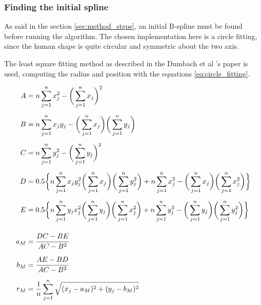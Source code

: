 \documentclass{article}
\newcommand{\vsp}{\vspace{\baselineskip}}
\begin{document}
\subsubsection{Finding the initial spline}

As said in the section \ref{sec:method_steps}, an initial B-spline must be found before running the algorithm. The chosen implementation here is a circle fitting, since the human shape is quite circular and symmetric about the two axis.

\vsp

The least square fitting method as described in the Dumbach et al 's paper \cite{circle_fitting} is used, computing the radius and position with the equations \ref{eq:circle_fitting}.

\begin{equation}
    \label{eq:circle_fitting}
    \begin{aligned}
        A &= n \sum \limits_{j=1}^{n}x_j^2 - 
        \bigg( \sum \limits_{j=1}^{n} x_j \bigg) ^2
        \\[5pt]
        B &= n \sum \limits_{j=1}^{n}x_j y_j -
        \bigg( \sum \limits_{j=1}^{n} x_j \bigg)
        \bigg( \sum \limits_{j=1}^{n} y_j \bigg) 
        \\[5pt]
        C &= n \sum \limits_{j=1}^{n}y_j^2 - 
        \bigg( \sum \limits_{j=1}^{n} y_j \bigg) ^2
        \\[5pt]
        D &= 0.5 \bigg\{ 
        n \sum \limits_{j=1}^{n}x_j y_j^2 
        \bigg( \sum \limits_{j=1}^{n} x_j \bigg) \bigg( \sum \limits_{j=1}^{n} y_j^2 \bigg)
        + n \sum \limits_{j=1}^{n}x_j^3 - 
        \bigg( \sum \limits_{j=1}^{n} x_j \bigg)
        \bigg( \sum \limits_{j=1}^{n} x_j^2 \bigg)
        \bigg\} 
        \\[5pt]
        E &=  0.5 \bigg\{
        n \sum \limits_{j=1}^{n}y_j x_j^2 
        \bigg( \sum \limits_{j=1}^{n} y_j \bigg) \bigg( \sum \limits_{j=1}^{n} x_j^2 \bigg)
        + n \sum \limits_{j=1}^{n}y_j^3 - 
        \bigg( \sum \limits_{j=1}^{n} y_j \bigg)
        \bigg( \sum \limits_{j=1}^{n} y_j^2 \bigg)
        \bigg\}
        \\[10pt]
        a_M &= \cfrac{DC-BE}{AC-B^2}
        \\[5pt]
        b_M &= \cfrac{AE-BD}{AC-B^2}
        \\[5pt]
        r_M &= \frac{1}{n} 
        \sum \limits_{j=1}^{n}
        \sqrt{(x_j-a_M)^2+(y_j-b_M)^2}
        \\
    \end{aligned}
\end{equation}
\end{document}

